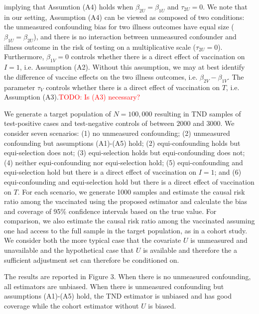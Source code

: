 \documentclass[11pt]{article}
\begin{document}
implying that Assumtion (A4) holds when $\beta_{2U}=\beta_{1U}$ and $\tau_{2U}=0$. We note that in our setting, Assumption (A4) can be viewed as composed of two conditions: the unmeasured confounding bias for two illness outcomes have equal size ($\beta_{1U}=\beta_{2U}$), and there is no interaction between unmeasured confounder and illness outcome in the risk of testing on a multiplicative scale ($\tau_{2U}=0$). Furthermore, $\beta_{1V}=0$ controls whether there is a direct effect of vaccination on $I = 1$, i.e. Assumption (A2). Without this assumption, we may at best identify the difference of vaccine effects on the two illness outcomes, i.e. $\beta_{2V}-\beta_{1V}$. The parameter $\tau_V$ controls whether there is a direct effect of vaccination on $T$, i.e. Assumption (A3).\textcolor{red}{TODO: Is (A3) necessary?}

We generate a target population of $N = 100,000$ resulting in TND samples of test-positive cases and test-negative controls of between $2000$ and $3000$. We consider seven scenarios: (1) no unmeasured confounding; (2) unmeasured confounding but assumptions (A1)-(A5) hold; (2) equi-confounding holds but equi-selection does not; (3) equi-selection holds but equi-confounding does not; (4) neither equi-confounding nor equi-selection hold; (5) equi-confounding and equi-selection hold but there is a direct effect of vaccination on $I = 1$; and (6) equi-confounding and equi-selection hold but there is a direct effect of vaccination on $T$. For each scenario, we generate 1000 samples and estimate the causal risk ratio among the vaccinated using the proposed estimator and calculate the bias and coverage of 95\% confidence intervals based on the true value. For comparison, we also estimate the causal risk ratio among the vaccinated assuming one had access to the full sample in the target population, as in a cohort study. We consider both the more typical case that the covariate $U$ is unmeasured and unavailable and the hypothetical case that $U$ is available and therefore the a sufficient adjustment set can therefore be conditioned on. 

The results are reported in Figure 3. When there is no unmeasured confounding, all estimators are unbiased. When there is unmeasured confounding but assumptions (A1)-(A5) hold, the TND estimator is unbiased and has good coverage while the cohort estimator without $U$ is biased. %
\end{document}
